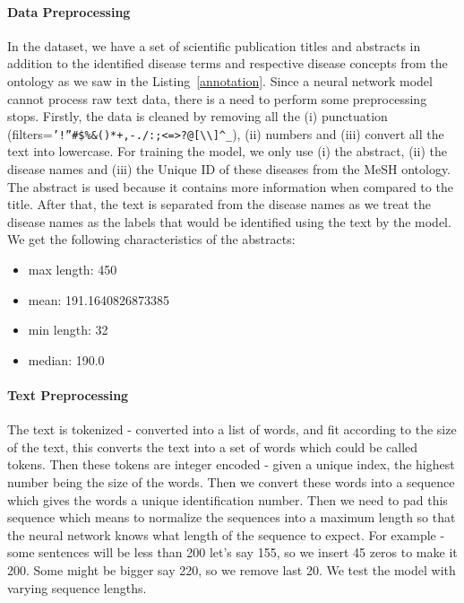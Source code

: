 \paragraph{Data Preprocessing}
In the dataset, we have a set of scientific publication titles and abstracts in addition to the identified disease terms and respective disease concepts from the ontology as we saw in the Listing~\ref{annotation}. 
Since a neural network model cannot process raw text data, there is a need to perform some preprocessing stops.
Firstly, the data is cleaned by removing all the (i) punctuation (filters=\verb|’!”#$%&()*+,-./:;<=>?@[\\]^_|), (ii) numbers and (iii) convert all the text into lowercase.  
For training the model, we only use (i) the abstract, (ii) the disease names and (iii) the Unique ID of these diseases from the MeSH ontology. The abstract is used because it contains more information when compared to the title. After that, the text is separated from the disease names as we treat the disease names as the labels that would be identified using the text by the model.
We get the following characteristics of the abstracts:
\begin{itemize}
    \item max length:  450
    \item mean:  191.1640826873385
    \item min length:  32
    \item median:  190.0
\end{itemize}
\paragraph{Text Preprocessing} The text is tokenized - converted into a list of words, and fit according to the size of the text, this converts the text into a set of words which could be called tokens.
Then these tokens are integer encoded - given a unique index, the highest number being the size of the words. 
Then we convert these words into a sequence which gives the words a unique identification number. Then we need to pad this sequence which means to normalize the sequences into a maximum length so that the neural network knows what length of the sequence to expect. 
For example - some sentences will be less than 200 let's say 155, so we insert 45 zeros to make it 200. Some might be bigger say 220, so we remove last 20. We test the model with varying sequence lengths. 


